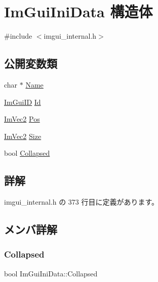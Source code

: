 \hypertarget{struct_im_gui_ini_data}{}\section{Im\+Gui\+Ini\+Data 構造体}
\label{struct_im_gui_ini_data}


{\ttfamily \#include $<$imgui\+\_\+internal.\+h$>$}

\subsection*{公開変数類}
\begin{DoxyCompactItemize}
\item 
char $\ast$ \mbox{\hyperlink{struct_im_gui_ini_data_aef4db96cc7332d492bba873028a00f66}{Name}}
\item 
\mbox{\hyperlink{imgui_8h_a1785c9b6f4e16406764a85f32582236f}{Im\+Gui\+ID}} \mbox{\hyperlink{struct_im_gui_ini_data_a8c3cd42549a5f432199d1a66e0133d80}{Id}}
\item 
\mbox{\hyperlink{struct_im_vec2}{Im\+Vec2}} \mbox{\hyperlink{struct_im_gui_ini_data_a8598c0d937901fc22f808f11f9aa6bac}{Pos}}
\item 
\mbox{\hyperlink{struct_im_vec2}{Im\+Vec2}} \mbox{\hyperlink{struct_im_gui_ini_data_af3d56b3e89c45d07d7927ab95dbd86fa}{Size}}
\item 
bool \mbox{\hyperlink{struct_im_gui_ini_data_a299660ea0cab78a8cbefa02314c8cf47}{Collapsed}}
\end{DoxyCompactItemize}


\subsection{詳解}


 imgui\+\_\+internal.\+h の 373 行目に定義があります。



\subsection{メンバ詳解}
\mbox{\label{struct_im_gui_ini_data_a299660ea0cab78a8cbefa02314c8cf47}} 
\subsubsection{\texorpdfstring{Collapsed}{Collapsed}}
{\footnotesize\ttfamily bool Im\+Gui\+Ini\+Data\+::\+Collapsed}



